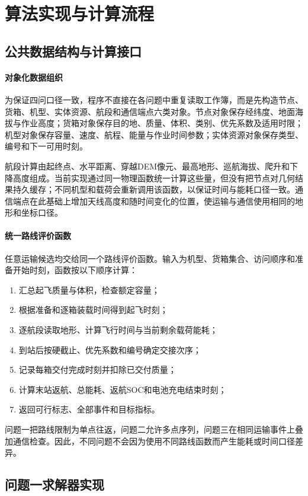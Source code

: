 \section{算法实现与计算流程}
\subsection{公共数据结构与计算接口}
\paragraph{对象化数据组织}
为保证四问口径一致，程序不直接在各问题中重复读取工作簿，而是先构造节点、货箱、机型、实体资源、航段和通信端点六类对象。节点对象保存经纬度、地面海拔与作业高度；货箱对象保存目的地、质量、体积、类别、优先系数及适用时限；机型对象保存容量、速度、航程、能量与作业时间参数；实体资源对象保存类型、编号和下一可用时刻。

航段计算由起终点、水平距离、穿越DEM像元、最高地形、巡航海拔、爬升和下降高度组成。当前实现通过同一物理函数统一计算这些量，但没有把节点对几何结果持久缓存；不同机型和载荷会重新调用该函数，以保证时间与能耗口径一致。通信端点在此基础上增加天线高度和随时间变化的位置，使运输与通信使用相同的地形和坐标口径。

\paragraph{统一路线评价函数}
任意运输候选均交给同一个路线评价函数。输入为机型、货箱集合、访问顺序和准备开始时刻，函数按以下顺序计算：
\begin{enumerate}
  \item 汇总起飞质量与体积，检查额定容量；
  \item 根据准备和逐箱装载时间得到起飞时刻；
  \item 逐航段读取地形、计算飞行时间与当前剩余载荷能耗；
  \item 到站后按硬截止、优先系数和编号确定交接次序；
  \item 记录每箱交付完成时刻并扣除已交付质量；
  \item 计算末站返航、总能耗、返航SOC和电池充电结束时刻；
  \item 返回可行标志、全部事件和目标指标。
\end{enumerate}
问题一把路线限制为单点往返，问题二允许多点序列，问题三在相同运输事件上叠加通信检查。因此，不同问题不会因为使用不同路线函数而产生能耗或时间口径差异。

\subsection{问题一求解器实现}
